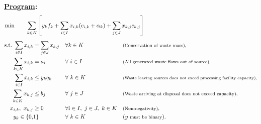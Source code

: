 \documentclass[12pt]{amsart}
\begin{document}
\textbf{\underline{Program}:} \\

\[ \min \qquad \sum_{k\in K} \left[ y_kf_k + \sum_{i\in I} x_{i,k}(c_{i,k}+\alpha_k) + \sum_{j\in J} x_{k,j}c_{k,j} \right]
 	\hspace{45ex} \]
\begin{align*} 
	\text{s.t.}\
	\sum_{i\in I}x_{i,k} &= \sum_{j\in J} x_{k,j} & & \forall k\in K & & \text{\footnotesize(Conservation of waste mass),}  \\
	\sum_{k\in K} x_{i,k} &= a_i & & \forall\ i\in I & & \text{\footnotesize(All generated waste flows out of source),}  \\
	\sum_{i\in I} x_{i,k} &\leq y_kq_k & & \forall\ k\in K & & \text{\scriptsize(Waste leaving sources does not exced processing facility capacity),}  \\
	\sum_{k\in K} x_{k,j} &\leq b_j & & \forall\ j\in J & & \text{\footnotesize(Waste arriving at disposal does not exceed capacity),}  \\
	x_{i,k},\ x_{k,j} &\geq 0 & & \forall i\in I,\ j\in J,\ k\in K & & \text{\footnotesize(Non-negativity),} \\
	y_k \in \{0,&1\} & &\forall\ k\in K & & (y\text{ \footnotesize must be binary}).
\end{align*}
\end{document}
